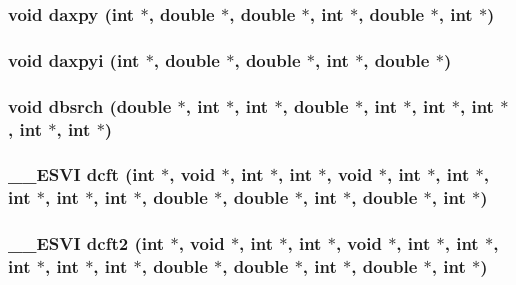 \subsubsection{\setlength{\rightskip}{0pt plus 5cm}void daxpy (int $\ast$, double $\ast$, double $\ast$, int $\ast$, double $\ast$, int $\ast$)}\label{essl_8h_b57f5184a334d1109e16c5ce2d24dd8f}


\subsubsection{\setlength{\rightskip}{0pt plus 5cm}void daxpyi (int $\ast$, double $\ast$, double $\ast$, int $\ast$, double $\ast$)}\label{essl_8h_487f116e92765b5bf42f753b6e429a73}


\subsubsection{\setlength{\rightskip}{0pt plus 5cm}void dbsrch (double $\ast$, int $\ast$, int $\ast$, double $\ast$, int $\ast$, int $\ast$, int $\ast$, int $\ast$, int $\ast$)}\label{essl_8h_e7183ae2f45630ad3357f3abcac1d790}


\subsubsection{\setlength{\rightskip}{0pt plus 5cm}\_\-\_\-ESVI dcft (int $\ast$, void $\ast$, int $\ast$, int $\ast$, void $\ast$, int $\ast$, int $\ast$, int $\ast$, int $\ast$, int $\ast$, double $\ast$, double $\ast$, int $\ast$, double $\ast$, int $\ast$)}\label{essl_8h_15b868777630aa0fc4346ff8bc27157f}


\subsubsection{\setlength{\rightskip}{0pt plus 5cm}\_\-\_\-ESVI dcft2 (int $\ast$, void $\ast$, int $\ast$, int $\ast$, void $\ast$, int $\ast$, int $\ast$, int $\ast$, int $\ast$, int $\ast$, double $\ast$, double $\ast$, int $\ast$, double $\ast$, int $\ast$)}\label{essl_8h_a1f6cb58eed824922d9e1c4c2c41e926}


